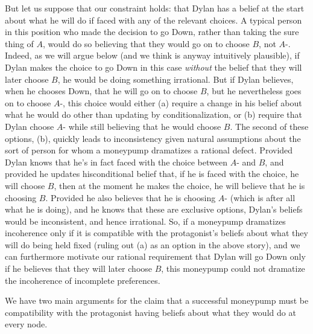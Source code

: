 \documentclass[
  11pt,
  letterpaper]{article}
\begin{document}
But let us suppose that our constraint holds: that Dylan has a belief at the start about what he will do if faced with any of the relevant choices. A typical person in this position who made the decision to go Down, rather than taking the sure thing of $A$, would do so believing that they would go on to choose $B$, not $A$-. Indeed, as we will argue below (and we think is anyway intuitively plausible), if Dylan makes the choice to go Down in this case \emph{without} the belief that they will later choose $B$, he would be doing something irrational. But if Dylan believes, when he chooses Down, that he will go on to choose $B$, but he nevertheless goes on to choose $A$-, this choice would either (a) require a change in his belief about what he would do other than updating by conditionalization, or (b) require that Dylan choose $A$- while still believing that he would choose $B$. The second of these options, (b), quickly leads to inconsistency given natural assumptions about the sort of person for whom a moneypump dramatizes a rational defect. Provided Dylan knows that he's in fact faced with the choice between $A$- and $B$, and provided he updates hisconditional belief that, if he is faced with the choice, he will choose $B$, then at the moment he makes the choice, he will believe that he is choosing $B$. Provided he also believes that he is choosing $A$- (which is after all what he is doing), and he knows that these are exclusive options, Dylan's beliefs would be inconsistent, and hence irrational. So, if a moneypump dramatizes incoherence only if it is compatible with the protagonist's beliefs about what they will do being held fixed (ruling out (a) as an option in the above story), and we can furthermore motivate our rational requirement that Dylan will go Down only if he believes that they will later choose $B$, this moneypump could not dramatize the incoherence of incomplete preferences.

We have two main arguments for the claim that a successful moneypump must be compatibility with the protagonist having beliefs about what they would do at every node.
\end{document}
